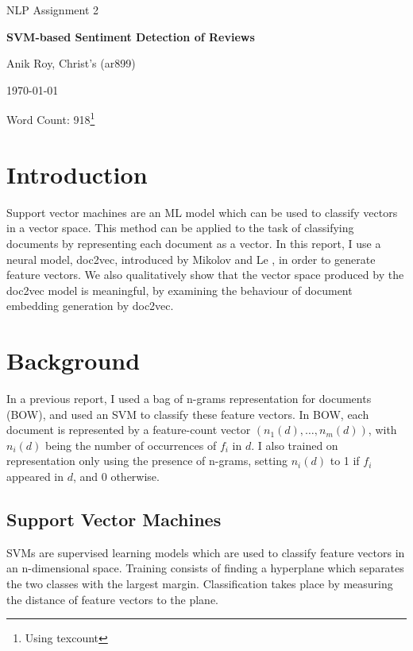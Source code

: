\documentclass[a4paper]{article}
\begin{document}
\centerline{\large NLP Assignment 2}
\vspace{0.2in}
\centerline{\Large\bf SVM-based Sentiment Detection of Reviews}
\vspace{0.1in}
\centerline{\large {Anik Roy, Christ's (ar899)}}
\vspace{0.1in}
\centerline{\large {\today}}
\vspace{0.05in}
\centerline{Word Count: 918\footnote{Using texcount}}
\vspace{0.2in}


\begin{multicols}{2}
  
\section{Introduction}

Support vector machines are an ML model which can be used to classify vectors in a vector space. This method can be applied to the task of classifying documents by representing each document as a vector. In this report, I use a neural model, doc2vec, introduced by Mikolov and Le \cite{DBLP:journals/corr/LeM14}, in order to generate feature vectors. We also qualitatively show that the vector space produced by the doc2vec model is meaningful, by examining the behaviour of document embedding generation by doc2vec.

\section{Background}

In a previous report, I used a bag of n-grams representation for documents (BOW), and used an SVM to classify these feature vectors. In BOW, each document is represented by a feature-count vector $(n_1(d), \dots ,n_m(d))$, with $n_i(d)$ being the number of occurrences of $f_i$ in $d$. I also trained on representation only using the presence of n-grams, setting $n_i(d)$ to 1 if $f_i$ appeared in $d$, and 0 otherwise.

\subsection{Support Vector Machines}

SVMs are supervised learning models which are used to classify feature vectors in an n-dimensional space. Training consists of finding a hyperplane which separates the two classes with the largest margin. Classification takes place by measuring the distance of feature vectors to the plane. 


\end{multicols}
\end{document}
